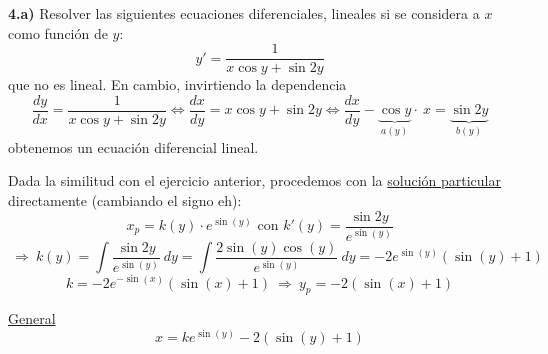 \begin{ejer} \textbf{4.a)}
    Resolver las siguientes ecuaciones diferenciales, lineales si se considera a $x$ como función de $y$:
    $$y'=\dfrac{1}{x\cos y+\sin 2y}$$
    que no es lineal. En cambio, invirtiendo la dependencia
    $$\dfrac{dy}{dx}=\dfrac{1}{x\cos y+\sin 2y} \iff \dfrac{dx}{dy}=x \cos y+\sin 2y \iff \dfrac{dx}{dy}-\underbrace{\cos y}_{a(y)} \cdot \: x=\underbrace{\sin 2y}_{b(y)}$$
    obtenemos un ecuación diferencial lineal.
\end{ejer}
\begin{sol}
    Dada la similitud con el ejercicio anterior, procedemos con la \underline{solución particular} directamente (cambiando el signo eh):
    $$x_p=k(y) \cdot e^{\sin(y)} \text{ con } k'(y)=\dfrac{\sin 2y}{e^{\sin(y)}} $$
    $$\: \Rightarrow \: k(y)=\int \dfrac{\sin 2y}{e^{\sin(y)}} \: dy= \int \dfrac{2 \sin (y) \cos (y)}{e^{\sin(y)}} \: dy= -2 e^{\sin(y)}{(\sin(y) + 1)} $$
    $$k=-2e^{-\sin(x)}(\sin(x)+1) \: \Rightarrow \: y_p=-2(\sin(x)+1)$$

    \underline{General}
    $$x=ke^{\sin(y)}-2 (\sin(y) + 1)$$
\end{sol}

